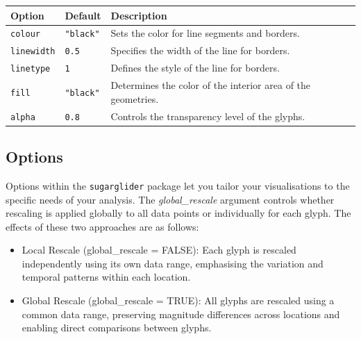 {\def\LTcaptype{none} %
\begin{longtable}[]{@{}
  >{\raggedright\arraybackslash}p{}
  >{\raggedright\arraybackslash}p{}
  >{\raggedright\arraybackslash}p{}@{}}
\toprule\noalign{}
\begin{minipage}[b]{\linewidth}\raggedright
Option
\end{minipage} & \begin{minipage}[b]{\linewidth}\raggedright
Default
\end{minipage} & \begin{minipage}[b]{\linewidth}\raggedright
Description
\end{minipage} \\
\midrule\noalign{}
\endhead
\bottomrule\noalign{}
\endlastfoot
\texttt{colour} & \texttt{"black"} & Sets the color for line segments and borders. \\
\texttt{linewidth} & \texttt{0.5} & Specifies the width of the line for borders. \\
\texttt{linetype} & \texttt{1} & Defines the style of the line for borders. \\
\texttt{fill} & \texttt{"black"} & Determines the color of the interior area of the geometries. \\
\texttt{alpha} & \texttt{0.8} & Controls the transparency level of the glyphs. \\
\end{longtable}
}

\subsection{Options}\label{options}

Options within the \texttt{sugarglider} package let you tailor your visualisations to the specific needs of your analysis. The \emph{global\_rescale} argument controls whether rescaling is applied globally to all data points or individually for each glyph. The effects of these two approaches are as follows:

\begin{itemize}
\tightlist
\item
  Local Rescale (global\_rescale = FALSE): Each glyph is rescaled independently using its own data range, emphasising the variation and temporal patterns within each location.
\item
  Global Rescale (global\_rescale = TRUE): All glyphs are rescaled using a common data range, preserving magnitude differences across locations and enabling direct comparisons between glyphs.
\end{itemize}

